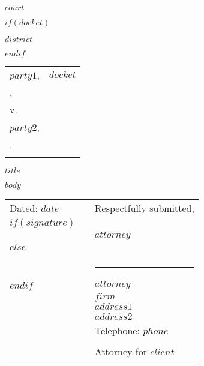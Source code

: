 \documentclass[letterpaper,11pt,oneside]{article}
\begin{document}
\thispagestyle{empty}

\begin{spacing}{1.2} 
\centerline{\bf{\MakeUppercase{{$court$}}}}
$if(docket)$
\centerline{\bf{\MakeUppercase{{$district$}}}}
$endif$
\end{spacing}
\vspace{2em}
{\noindent
\begin{tabular}{ p{3in} | p{3in} }
\cline{1-1} \\
{$party1$}, & \hspace{.2em} {$docket$} \\
\hspace{5cm}{$party1status$}, & \\
\centerline{v.} &  \\
{$party2$}, & \hspace{2em}  \\
\hspace{5cm}{$party2status$}. & \\
& \\
\cline{1-1}
\end{tabular}
\vspace{.5cm}
\begin{center}
\large\bfseries\MakeUppercase{$title$}
\end{center}
}

$body$

\vspace{1cm}

\noindent \begin{tabular}{l l l}
Dated: {$date$} & \hspace{2cm} & Respectfully submitted, \\
$if(signature)$
              & & \\
              & & \uline{\sffamily\Huge{$attorney$}} \\
$else$
              & & \\
              & & \\
              & & \rule{5cm}{.25pt}\\
$endif$
              & & {$attorney$} \\
              & & \MakeUppercase{$firm$} \\
              & & {$address1$} \\
              & & {$address2$} \\
              & & Telephone: {$phone$} \\
              & & \\
              & & Attorney for {$client$} \\
\end{tabular}
\end{document}
